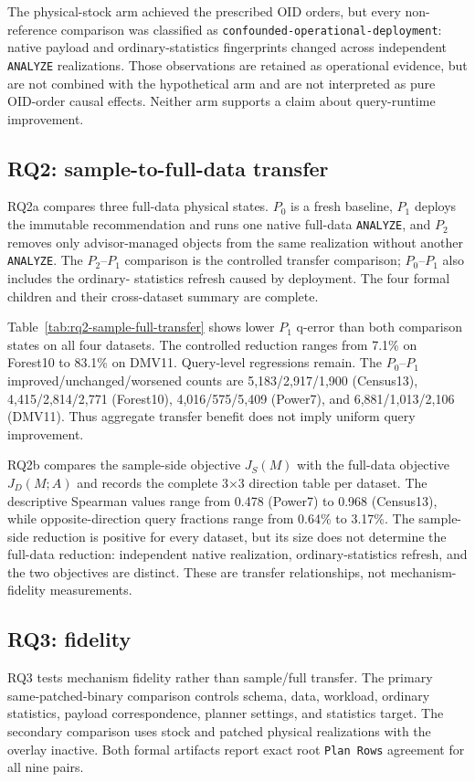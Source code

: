 The physical-stock arm achieved the prescribed OID orders, but every
non-reference comparison was classified as
\texttt{confounded-}\allowbreak\texttt{operational-}\allowbreak\texttt{deployment}:
native payload and
ordinary-statistics fingerprints changed across independent \texttt{ANALYZE}
realizations. Those observations are retained as operational evidence, but
are not combined with the hypothetical arm and are not interpreted as pure
OID-order causal effects. Neither arm supports a claim about query-runtime
improvement.

\subsection{RQ2: sample-to-full-data transfer}
RQ2a compares three full-data physical states. $P_0$ is a fresh baseline,
$P_1$ deploys the immutable recommendation and runs one native full-data
\texttt{ANALYZE}, and $P_2$ removes only advisor-managed objects from the same
realization without another \texttt{ANALYZE}. The $P_2$--$P_1$ comparison is
the controlled transfer comparison; $P_0$--$P_1$ also includes the ordinary-
statistics refresh caused by deployment. The four formal children and their
cross-dataset summary are complete.



Table~\ref{tab:rq2-sample-full-transfer} shows lower $P_1$ q-error than both
comparison states on all four datasets. The controlled reduction ranges from
7.1\% on Forest10 to 83.1\% on DMV11. Query-level regressions remain. The
$P_0$--$P_1$ improved/unchanged/worsened counts are 5,183/2,917/1,900
(Census13), 4,415/2,814/2,771 (Forest10), 4,016/575/5,409 (Power7), and
6,881/1,013/2,106 (DMV11). Thus aggregate
transfer benefit does not imply uniform query improvement.

RQ2b compares the sample-side objective $J_S(M)$ with the full-data objective
$J_D(M;A)$ and records the complete 3$\times$3 direction table per dataset.
The descriptive Spearman values range from 0.478 (Power7) to 0.968
(Census13), while opposite-direction query fractions range from 0.64\% to
3.17\%. The sample-side reduction is positive for every dataset, but its size
does not determine the full-data reduction: independent native realization,
ordinary-statistics refresh, and the two objectives are distinct. These are
transfer relationships, not mechanism-fidelity measurements.

\subsection{RQ3: fidelity}
RQ3 tests mechanism fidelity rather than sample/full transfer. The primary
same-patched-binary comparison controls schema, data, workload, ordinary
statistics, payload correspondence, planner settings, and statistics target.
The secondary comparison uses stock and patched physical realizations with the
overlay inactive. Both formal artifacts report exact root \texttt{Plan Rows}
agreement for all nine pairs.


